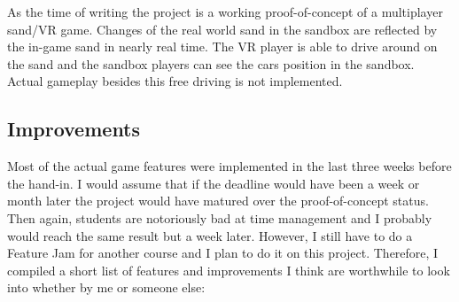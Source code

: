 \documentclass[12pt,a4paper,twoside,titlepage,headsepline,numbers=noenddot,listof=totoc,index=totoc,bibliography=totoc]{scrartcl}
\theoremstyle{break}
\begin{document}
As the time of writing the project is a working proof-of-concept of a multiplayer sand/VR game. Changes of the real world sand in the sandbox are reflected by the in-game sand in nearly real time. The VR player is able to drive around on the sand and the sandbox players can see the cars position in the sandbox. Actual gameplay besides this free driving is not implemented.  

\subsection{Improvements}
Most of the actual game features were implemented in the last three weeks before the hand-in. I would assume that if the deadline would have been a week or month later the project would have matured over the proof-of-concept status. Then again, students are notoriously bad at time management and I probably would reach the same result but a week later. However, I still have to do a Feature Jam for another course and I plan to do it on this project. Therefore, I compiled a short list of features and improvements I think are worthwhile to look into whether by me or someone else: 
\end{document}
